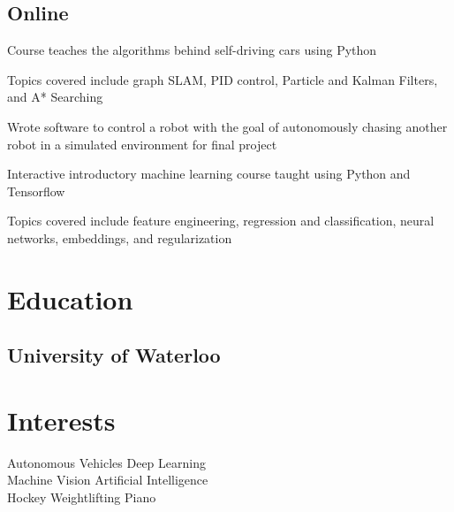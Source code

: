 \documentclass[]{deedy-resume-openfont}
\begin{document}
\begin{minipage}[t]{0.33\textwidth}
\subsection{Online}
\vspace{\topsep}
\begin{tightemize}
\item Course teaches the algorithms behind self-driving cars using Python
\item Topics covered include graph SLAM, PID control, Particle and Kalman Filters, and A* Searching
\item Wrote software to control a robot with the goal of autonomously chasing another robot in a simulated environment for final project
\end{tightemize}

\begin{tightemize}
\item Interactive introductory machine learning course taught using Python and Tensorflow
\item Topics covered include feature engineering, regression and classification, neural networks, embeddings, and regularization
\end{tightemize}

\sectionsep


\section{Education} 

\subsection{University of Waterloo}
\sectionsep



\section{Interests}
Autonomous Vehicles \textbullet{} Deep Learning \\ \textbullet{} Machine Vision \textbullet{} Artificial Intelligence \\ \textbullet{} Hockey \textbullet{} Weightlifting \textbullet{} Piano

%
%

\end{minipage} 
\end{document}
